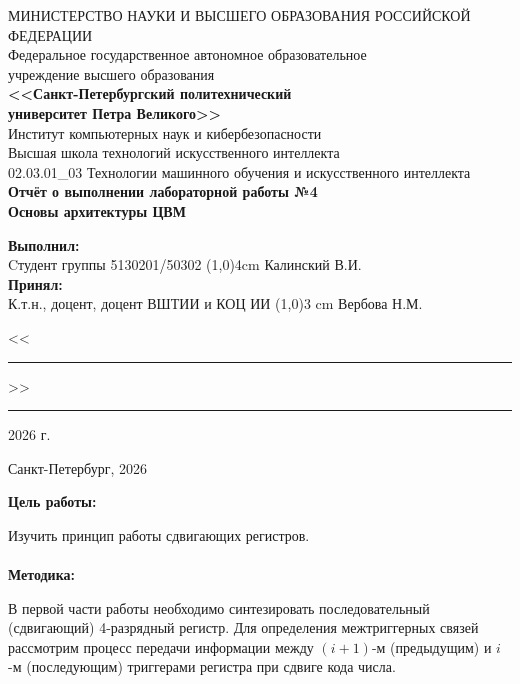 \documentclass[14pt, a4paper]{extarticle}
\begin{document}
\thispagestyle{empty}
\begin{center}
    \hspace{0.2cm}МИНИСТЕРСТВО НАУКИ И ВЫСШЕГО ОБРАЗОВАНИЯ РОССИЙСКОЙ ФЕДЕРАЦИИ\\
    Федеральное государственное автономное образовательное\\
    учреждение высшего образования\\
    {\bf <<Санкт-Петербургский политехнический\\
    университет Петра Великого>>}\\
    Институт компьютерных наук и кибербезопасности\\
    Высшая школа технологий искусственного интеллекта\\
    02.03.01\_03 Технологии машинного обучения и искусственного интеллекта\\
    \vspace{3cm}
    \Large\bf{
        Отчёт о выполнении лабораторной работы №4\\
        Основы архитектуры ЦВМ\\[1cm]
    }
\end{center}
\vspace{2cm}
\begin{flushleft}
    {\bf Выполнил:}\\
    Cтудент группы 5130201/50302 \hfill
    \line(1,0){4cm} \quad Калинский В.И.\\
    {\bf Принял:}\\
    К.т.н., доцент, доцент ВШТИИ и КОЦ ИИ \hfill
    \line(1,0){3 cm} \quad Вербова Н.М.\\[0.5cm]
    { \hfill<<\rule{1cm}{0.5pt}>>\rule{2cm}{0.5pt}\hspace{3pt}2026 г.}
\end{flushleft}
\vspace{1cm}
\begin{center}
    Санкт-Петербург, 2026
\end{center}
\newpage
\textbf{Цель работы:}

\noindent Изучить принцип работы сдвигающих регистров.
\\\\
\textbf{Методика:}

В первой части работы необходимо синтезировать последовательный (сдвигающий) 4-разрядный регистр. Для определения межтриггерных связей рассмотрим процесс передачи информации между $(i+1)$-м (предыдущим) и $i$-м (последующим) триггерами регистра при сдвиге кода числа. 
\end{document}
